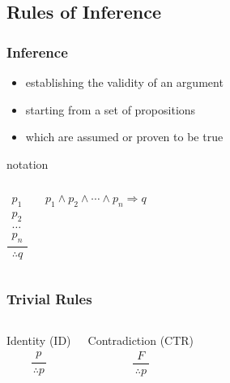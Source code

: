 \documentclass[dvipsnames]{beamer}
\begin{document}
\subsection{Rules of Inference}

\begin{frame}
  \frametitle{Inference}

  \begin{itemize}
    \item establishing the validity of an argument
    \item starting from a set of propositions
    \item which are assumed or proven to be true
  \end{itemize}

  \pause
  \begin{block}{notation}
    \begin{columns}
      \[
      \frac
        {
          \begin{array}{c}
            p_1\\
            p_2\\
            \dots\\
            p_n
          \end{array}
        }
        {
          \therefore q
        }
      \]

      $p_1 \wedge p_2 \wedge \cdots \wedge p_n \Rightarrow q$
    \end{columns}
  \end{block}
\end{frame}

\begin{frame}
  \frametitle{Trivial Rules}

  \begin{columns}
    \begin{block}{Identity (ID)}
      \[
      \frac
        {
          \begin{array}{c}
            p
          \end{array}
        }
        {
          \therefore p
        }
      \]
    \end{block}

    \pause
    \begin{block}{Contradiction (CTR)}
    \[
    \frac
      {
        \begin{array}{c}
          F
        \end{array}
      }
      {
        \therefore p
      }
    \]
    \end{block}
  \end{columns}
\end{frame}
\end{document}
